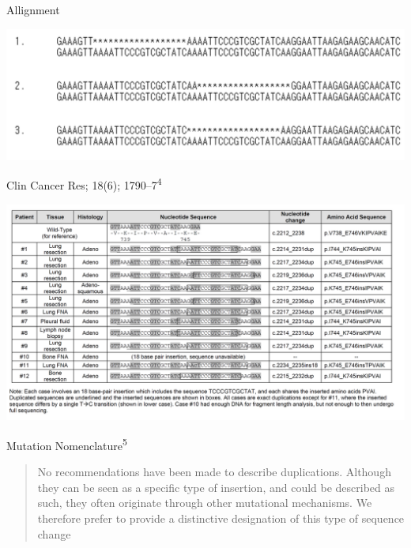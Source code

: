 \documentclass[
  ignorenonframetext,
]{beamer}
\begin{document}
\begin{frame}{Allignment}
\protect\hypertarget{allignment}{}

\includegraphics{assets/img/sequence.png}

\end{frame}

\begin{frame}{Clin Cancer Res; 18(6); 1790--7\textsuperscript{4}}
\protect\hypertarget{clin-cancer-res-186-17907--he_2012_egfr_clinicalcancerresearch}{}

\includegraphics{assets/img/exon19.png}

\end{frame}

\begin{frame}{Mutation Nomenclature\textsuperscript{5}}
\protect\hypertarget{mutation-nomenclature--dunnen_2000_mutation_hummutat}{}

\begin{quote}
No recommendations have been made to describe duplications. Although
they can be seen as a specific type of insertion, and could be described
as such, they often originate through other mutational mechanisms. We
therefore prefer to provide a distinctive designation of this type of
sequence change
\end{quote}

\end{frame}
\end{document}
